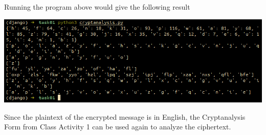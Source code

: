 \documentclass{article}
\begin{document}
Running the program above would give the following result

\begin{center}
    \includegraphics[scale=0.68]{task01.png}
\end{center}

Since the plaintext of the encrypted message is in English, the Cryptanalysis
Form from Class Activity 1 can be used again to analyze the ciphertext.
\end{document}
